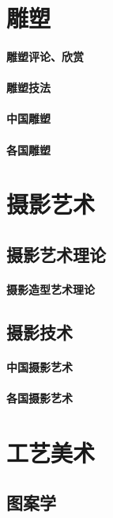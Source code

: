 \documentclass[UTF8]{../RepresentationUniverse}
\begin{document}
\chapter{雕塑}
    \subsubsection{雕塑评论、欣赏}
    \subsubsection{雕塑技法}
    \subsubsection{中国雕塑}
    \subsubsection{各国雕塑}



\chapter{摄影艺术}
    \section{摄影艺术理论}
        \subsubsection{摄影造型艺术理论}
    \section{摄影技术}
        \subsubsection{中国摄影艺术}
        \subsubsection{各国摄影艺术}




        
\chapter{工艺美术}
    \section{图案学}
\end{document}
